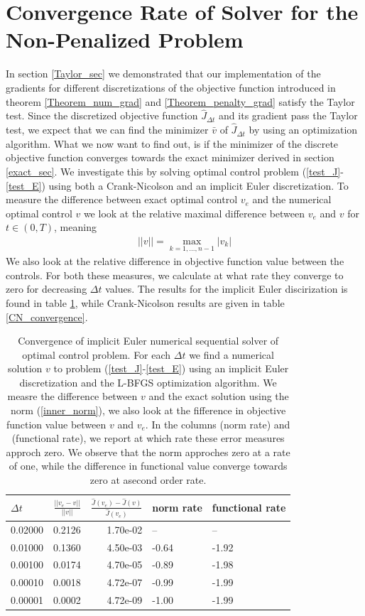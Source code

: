\section{Convergence Rate of Solver for the Non-Penalized Problem}
In section \ref{Taylor_sec} we demonstrated that our implementation of the gradients for different discretizations of the objective function introduced in theorem \ref{Theorem_num_grad} and \ref{Theorem_penalty_grad} satisfy the Taylor test. Since the discretized objective function $\hat J_{\Delta t}$ and its gradient pass the Taylor test, we expect that we can find the minimizer $\bar v$ of $\hat J_{\Delta t}$ by using an optimization algorithm. What we now want to find out, is if the minimizer of the discrete objective function converges towards the exact minimizer derived in section \ref{exact_sec}. We investigate this by solving optimal control problem (\ref{test_J}-\ref{test_E}) using both a Crank-Nicolson and an implicit Euler discretization. To measure the difference between exact optimal control $v_e$ and the numerical optimal control $v$ we look at the relative maximal difference between $v_e$ and $v$ for $t\in(0,T)$, meaning
\begin{align}
||v|| = \max_{k=1,...,n-1}|v_k| \label{inner_norm}
\end{align} 
We also look at the relative difference in objective function value between the controls. For both these measures, we calculate at what rate they converge to zero for decreasing $\Delta t$ values. The results for the implicit Euler discirization is found in table \ref{IE_convergence}, while Crank-Nicolson results are given in table \ref{CN_convergence}.
\begin{table}[!h]
\caption{Convergence of implicit Euler numerical sequential solver of optimal control problem. For each $\Delta t$ we find a numerical solution $v$ to problem (\ref{test_J}-\ref{test_E}) using an implicit Euler discretization and the L-BFGS optimization algorithm. We measre the difference between $v$ and the exact solution using the norm (\ref{inner_norm}), we also look at the fifference in objective function value between $v$ and $v_e$. In the columns (norm rate) and (functional rate), we report at which rate these error measures approch zero. We observe that the norm approches zero at a rate of one, while the difference in functional value converge towards zero at asecond order rate.} \label{IE_convergence}
\centering
\begin{tabular}{lrrll}
\toprule
{} $\Delta t$&    $\frac{||v_e-v||}{||v||}$ &  $\frac{\hat J(v_e)-\hat J(v)}{\hat J(v_e)}$ &   norm rate &    functional rate \\
\midrule
0.02000 &  0.2126 &  1.70e-02 &        -- &       -- \\
0.01000 &  0.1360 &  4.50e-03 & -0.64 & -1.92 \\
0.00100 &  0.0174 &  4.70e-05 & -0.89 & -1.98 \\
0.00010 &  0.0018 &  4.72e-07 &   -0.99 & -1.99 \\
0.00001 &  0.0002 &  4.72e-09 &  -1.00 & -1.99 \\
\bottomrule
\end{tabular}
\end{table}
